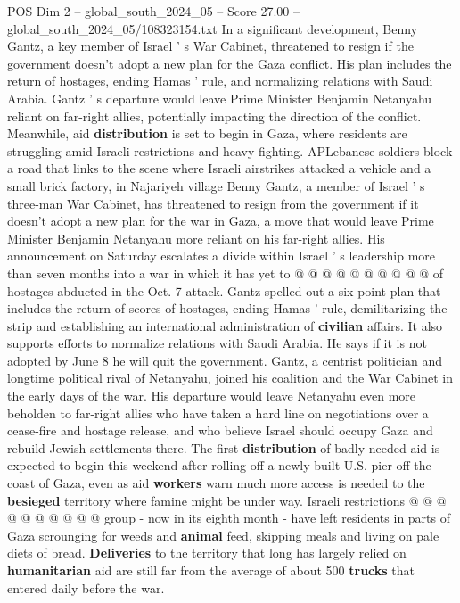 \begin{textsample}{POS Dim 2 – global\_south\_2024\_05 – Score 27.00 – global\_south\_2024\_05/108323154.txt}  \label{ex:f2_pos_079}
In a significant development, Benny Gantz, a key member of Israel ' s War Cabinet, threatened to resign if the government doesn't adopt a new plan for the Gaza conflict.
His plan includes the return of hostages, ending Hamas ' rule, and normalizing relations with Saudi Arabia.
Gantz ' s departure would leave Prime Minister Benjamin Netanyahu reliant on far-right allies, potentially impacting the direction of the conflict.
Meanwhile, aid \textbf{distribution} is set to begin in Gaza, where residents are struggling amid Israeli restrictions and heavy fighting.
APLebanese soldiers block a road that links to the scene where Israeli airstrikes attacked a vehicle and a small brick factory, in Najariyeh village Benny Gantz, a member of Israel ' s three-man War Cabinet, has threatened to resign from the government if it doesn't adopt a new plan for the war in Gaza, a move that would leave Prime Minister Benjamin Netanyahu more reliant on his far-right allies.
His announcement on Saturday escalates a divide within Israel ' s leadership more than seven months into a war in which it has yet to @ @ @ @ @ @ @ @ @ @ of hostages abducted in the Oct. 7 attack.
Gantz spelled out a six-point plan that includes the return of scores of hostages, ending Hamas ' rule, demilitarizing the strip and establishing an international administration of \textbf{civilian} affairs.
It also supports efforts to normalize relations with Saudi Arabia.
He says if it is not adopted by June 8 he will quit the government.
Gantz, a centrist politician and longtime political rival of Netanyahu, joined his coalition and the War Cabinet in the early days of the war.
His departure would leave Netanyahu even more beholden to far-right allies who have taken a hard line on negotiations over a cease-fire and hostage release, and who believe Israel should occupy Gaza and rebuild Jewish settlements there.
The first \textbf{distribution} of badly needed aid is expected to begin this weekend after rolling off a newly built U.S. pier off the coast of Gaza, even as aid \textbf{workers} warn much more access is needed to the \textbf{besieged} territory where famine might be under way.
Israeli restrictions @ @ @ @ @ @ @ @ @ @ group - now in its eighth month - have left residents in parts of Gaza scrounging for weeds and \textbf{animal} feed, skipping meals and living on pale diets of bread. \textbf{Deliveries} to the territory that long has largely relied on \textbf{humanitarian} aid are still far from the average of about 500 \textbf{trucks} that entered daily before the war.

\end{textsample}
